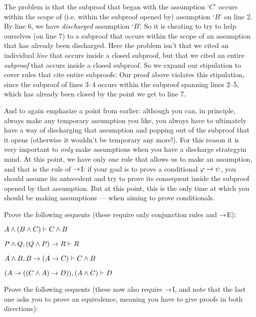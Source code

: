 The problem is that the subproof that began with the assumption `$C$' occurs within the scope of (i.e. within the subproof opened by) assumption `$B$' on line 2. By line 6, we have \emph{discharged} assumption `$B$'. So it is cheating to try to help ourselves (on line 7) to a subproof that occurs within the scope of an assumption that has already been discharged.  Here the problem isn't that we cited an individual \emph{line} that occurs inside a closed subproof, but that we cited an entire \emph{subproof} that occurs inside a closed subproof.  So we expand our stipulation to cover rules that cite entire subproofs:
Our proof above violates this stipulation, since the subproof of lines 3--4 occurs within the subproof spanning lines 2--5, which has already been closed by the point we get to line 7.


And to again emphasize a point from earlier: although you can, in principle, always make any temporary assumption you like, you always have to ultimately have a way of discharging that assumption and popping out of the subproof that it opens (otherwise it wouldn't be temporary any more!).    For this reason it is very important to \emph{only}  make assumptions when you have a discharge strategyin mind.  At this point, we have only one rule that allows us to make an assumption, and that is the rule of $\rightarrow$I: if your goal is to prove a conditional $\mathcal{\varphi} \rightarrow \mathcal{\psi}$, you should assume its antecedent \meta{\varphi} and try to prove its consequent \meta{\psi} inside the subproof opened by that assumption.  But at this point, this is the only time at which you should be making assumptions --- when aiming to prove conditionals.

\practiceproblems
\problempart
Prove the following sequents (these require only conjunction rules and $\rightarrow$E):

\begin{earg}
\item $A \wedge (B \wedge C) \vdash C \wedge B$
\item $P \wedge Q, (Q \wedge P) \rightarrow R \vdash R$
\item $A \wedge B, B \rightarrow (A \rightarrow C) \vdash C \wedge B$
 \item $(A\rightarrow ((C\wedge  A)\rightarrow D)), (A\wedge  C) \vdash D$
\end{earg}

\problempart
Prove the following sequents (these now also require $\rightarrow$I, and note that the last one asks you to prove an equivalence, meaning you have to give proofs in both directions):

